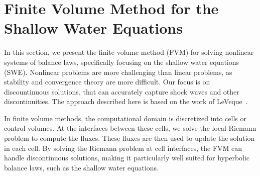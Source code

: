 \section{Finite Volume Method for the Shallow Water Equations}
In this section, we present the finite volume method (FVM) for solving nonlinear systems of balance laws, specifically focusing on the shallow water equations (SWE).
Nonlinear problems are more challenging than linear problems, as stability and convergence theory are more difficult.
Our focus is on discountinuous solutions, that can accurately capture shock waves and other discontinuities.
The approach described here is based on the work of LeVeque~\cite{LeVeque2002}.

In finite volume methods, the computational domain is discretized into cells or control volumes.
At the interfaces between these cells, we solve the local Riemann problem to compute the fluxes.
These fluxes are then used to update the solution in each cell.
By solving the Riemann problem at cell interfaces, the FVM can handle discontinuous solutions, making it particularly well suited for hyperbolic balance laws, such as the shallow water equations.

